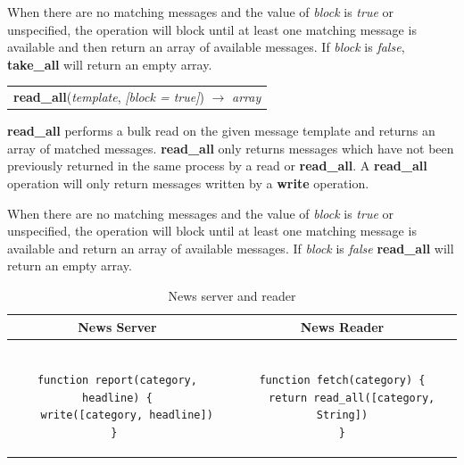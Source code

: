 \documentclass[lnicst]{svmultln}
\begin{document}
    When there are no matching messages and the value of \textit{block} is \textit{true} or unspecified, the operation will block until at least one matching message is available and then return an array of available messages. If \textit{block} is \textit{false}, \textbf{take\_all} will return an empty array.

\begin{table}
\begin{tabular}{c}
\textbf{read\_all}(\textit{template}, \textit{[block = true]}) $\rightarrow$ \textit{array}
\end{tabular}
\end{table}

    \textbf{read\_all} performs a bulk read on the given message template and returns an array of matched messages. \textbf{read\_all} only returns messages which have not been previously returned in the same process by a read or \textbf{read\_all}. A \textbf{read\_all} operation will only return messages written by a \textbf{write} operation.

When there are no matching messages and the value of \textit{block} is \textit{true} or unspecified, the operation will block until at least one matching message is available and return an array of available messages. If \textit{block} is \textit{false} \textbf{read\_all} will return an empty array.

\begin{table}
\centering
\caption{News server and reader}
\begin{tabular}{|c|c|} \hline
\textbf{News Server} & \textbf{News Reader} \\ \hline
\begin{minipage}{2.45in}
\begin{verbatim}

function report(category, headline) {
   write([category, headline])
} 

\end{verbatim}
\end{minipage}
&
\begin{minipage}{2.5in}
\begin{verbatim}

function fetch(category) {
   return read_all([category, String])
}

\end{verbatim}
\end{minipage}
\\ \hline
\end{tabular}
\label{fig:newsreader}
\end{table}
\end{document}
